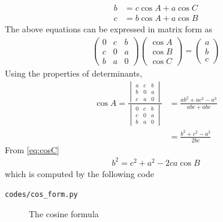 \documentclass[journal,12pt,twocolumn]{IEEEtran}
\renewcommand\thesection{\arabic{section}}
\begin{document}
\begin{enumerate}[label=\thesection.\arabic*
,ref=\thesection.\theenumi]
\begin{align}
b &= c \cos A + a \cos C \\
c &= b \cos A + a \cos B
\end{align}
%
  The above equations can be expressed in matrix form as
%
\begin{align}
\begin{pmatrix}
0 & c & b \\
c & 0 & a \\
b & a & 0
\end{pmatrix}
\begin{pmatrix}
\cos A \\
\cos B \\
\cos C
\end{pmatrix}
= 
\begin{pmatrix}
a\\
b\\
c
\end{pmatrix}
\end{align}
%
Using the properties of determinants,
%
\begin{align}
\cos A = \frac{
\begin{vmatrix}
a & c & b \\
b & 0 & a \\
c & a & 0
\end{vmatrix}
	}
	{
\begin{vmatrix}
0 & c & b \\
c & 0 & a \\
b & a & 0
\end{vmatrix}
	}
	&=\frac{ab^2 + ac^2 - a^3}{abc + abc} 
\\
&= \frac{b^2 + c^2 - a^2}{2bc}
\label{eq:cosC}
\end{align}
From \eqref{eq:cosC}
\begin{align}
\label{eq:b_cos_form}
b^2 = c^2+a^2-2ca\cos B
\end{align}
which is computed by the following code
\begin{lstlisting}
codes/cos_form.py
\end{lstlisting}
%
\begin{figure}[!ht]
	\begin{center}
		
		\resizebox{\columnwidth}{!}{}
	\end{center}
	\caption{The cosine formula}
	\label{ch2_cosine_formula}	
\end{figure}


\end{enumerate}
\end{document}
